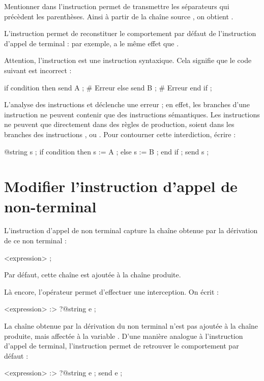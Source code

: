 Mentionner  dans l'instruction  permet de transmettre les séparateurs qui précèdent les parenthèses. Ainsi à partir de la chaîne source , on obtient .


L'instruction  permet de reconstituer le comportement par défaut de l'instruction d'appel de terminal : par exemple,  a le même effet que \galgas{$($ ;}.


Attention, l'instruction  est une instruction syntaxique. Cela signifie que le code suivant est incorrect :
\begin{galgascode}
if condition then
  send A ; # Erreur
else
  send B ; # Erreur
end if ;
\end{galgascode}

L'analyse des instructions  et   déclenche une erreur ; en effet, les branches d'une instruction  ne peuvent contenir que des instructions sémantiques. Les instructions  ne peuvent que directement dans des règles de production, soient dans les branches des instructions ,  ou . Pour contourner cette interdiction, écrire :
\begin{galgascode}
@string s ;
if condition then
  s := A ;
else
  s := B ;
end if ;
send s ;
\end{galgascode}



\section{Modifier l'instruction d'appel de non-terminal}

L'instruction d'appel de non terminal capture la chaîne obtenue par la dérivation de ce non terminal :
\begin{galgascode}
<expression> ;
\end{galgascode}


Par défaut, cette chaîne est ajoutée à la chaîne produite.

Là encore, l'opérateur \galgas{\:>} permet d'effectuer une interception. On écrit :
\begin{galgascode}
<expression> :> ?@string e ;
\end{galgascode}

La chaîne obtenue par la dérivation du non terminal  n'est pas ajoutée à la chaîne produite, mais affectée à la variable . D'une manière analogue à l'instruction d'appel de terminal, l'instruction  permet de retrouver le comportement par défaut :
\begin{galgascode}
<expression> :> ?@string e ; send e ;
\end{galgascode}

